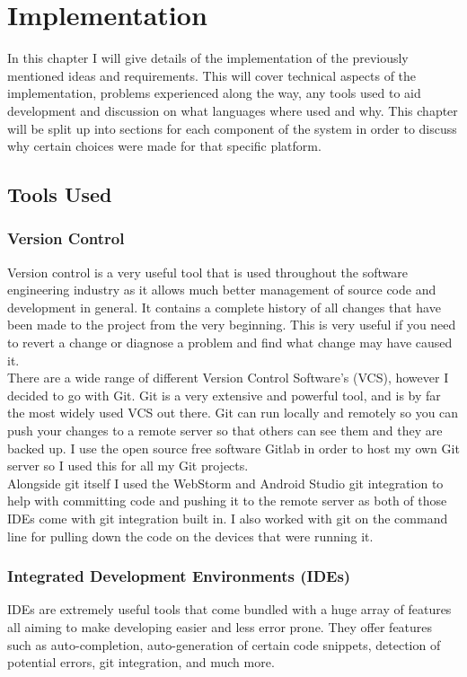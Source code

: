 \chapter{Implementation}
\label{chap:implementation}
In this chapter I will give details of the implementation of the previously mentioned ideas and requirements. This will cover technical aspects of the implementation, problems experienced along the way, any tools used to aid development and discussion on what languages where used and why. This chapter will be split up into sections for each component of the system in order to discuss why certain choices were made for that specific platform.

\section{Tools Used}

\subsection{Version Control}
Version control is a very useful tool that is used throughout the software engineering industry as it allows much better management of source code and development in general. It contains a complete history of all changes that have been made to the project from the very beginning. This is very useful if you need to revert a change or diagnose a problem and find what change may have caused it.
\\
\indent There are a wide range of different Version Control Software's (VCS), however I decided to go with Git. Git is a very extensive and powerful tool, and is by far the most widely used VCS out there. Git can run locally and remotely so you can push your changes to a remote server so that others can see them and they are backed up. I use the open source free software Gitlab in order to host my own Git server so I used this for all my Git projects.
\\
\indent Alongside git itself I used the WebStorm and Android Studio git integration to help with committing code and pushing it to the remote server as both of those IDEs come with git integration built in. I also worked with git on the command line for pulling down the code on the devices that were running it.

\subsection{Integrated Development Environments (IDEs)}
IDEs are extremely useful tools that come bundled with a huge array of features all aiming to make developing easier and less error prone. They offer features such as auto-completion, auto-generation of certain code snippets, detection of potential errors, git integration, and much more.


